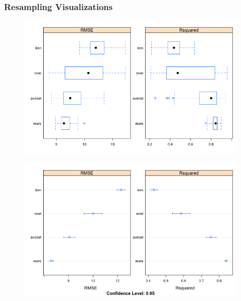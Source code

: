 \documentclass[letterpaper,12pt,titlepage,oneside,final]{report}
\begin{document}
            \subsubsection {Resampling Visualizations}
                \begin{figure}[!h]
                    \centering
                    \includegraphics[width=\textwidth]{resamp_bwplot}
                    \caption{}
                    \label{resamp_bwplot}
                \end{figure}
                \begin{figure}[!h]
                    \centering
                    \includegraphics[width=\textwidth]{resamp_dotplot}
                    \caption{}
                    \label{resamp_dotplot}
                \end{figure}
\end{document}
